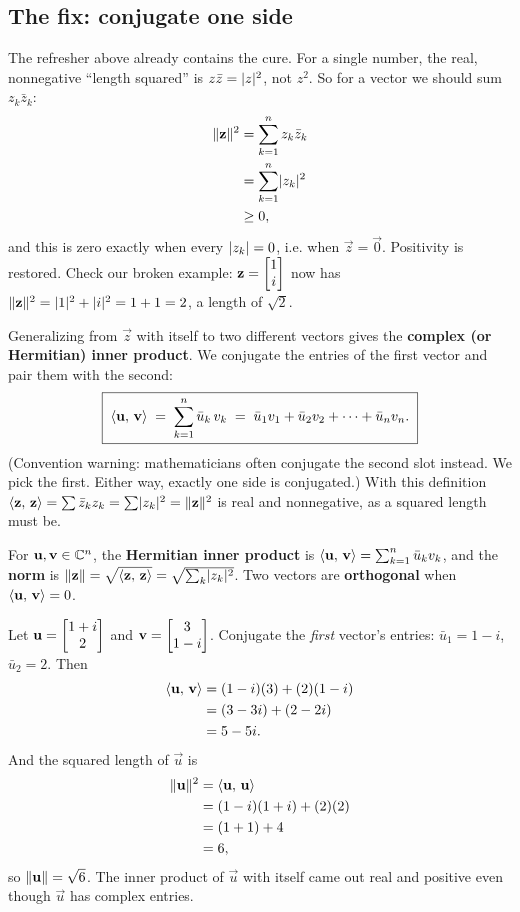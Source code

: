 \subsection{The fix: conjugate one side}

The refresher above already contains the cure. For a single number, the real,
nonnegative ``length squared'' is $z\bar z = \lvert z\rvert^2$, not $z^2$. So for a vector
we should sum $z_k\bar z_k$:
\begin{align*}
  \lVert\mathbf{z}\rVert^2 &= \sum_{k=1}^n z_k\bar z_k \\
  &= \sum_{k=1}^n \lvert z_k\rvert^2 \\
  &\ge 0,
\end{align*}
and this is zero exactly when every $\lvert z_k\rvert=0$, i.e. when $\vec z = \vec 0$.
Positivity is restored. Check our broken example: $\mathbf{z}=\begin{bmatrix}1\\i\end{bmatrix}$ now has
$\lVert\mathbf{z}\rVert^2 = \lvert1\rvert^2 + \lvert i\rvert^2 = 1 + 1 = 2$, a length of
$\sqrt 2$.

Generalizing from $\vec z$ with itself to two different vectors gives the
\textbf{complex (or Hermitian) inner product}. We conjugate the entries of the
first vector and pair them with the second:
\[
  \boxed{\;\langle \mathbf{u},\, \mathbf{v} \rangle \;=\; \sum_{k=1}^n \bar u_k\, v_k
  \;=\; \bar u_1 v_1 + \bar u_2 v_2 + \cdots + \bar u_n v_n. \;}
\]
(Convention warning: mathematicians often conjugate the second slot instead. We pick
the first. Either way, exactly one side is
conjugated.) With this definition $\langle \mathbf{z},\, \mathbf{z} \rangle = \sum\bar z_kz_k =
\sum\lvert z_k\rvert^2 = \lVert\mathbf{z}\rVert^2$ is real and nonnegative, as a squared length
must be.

\begin{definition}\label{ch32:inner}
For $\mathbf{u},\mathbf{v}\in\mathbb{C}^n$, the \textbf{Hermitian inner product} is
$\langle \mathbf{u},\, \mathbf{v} \rangle = \sum_{k=1}^n \bar u_k v_k$, and the \textbf{norm} is
$\lVert\mathbf{z}\rVert = \sqrt{\langle \mathbf{z},\, \mathbf{z} \rangle} = \sqrt{\sum_k\lvert z_k\rvert^2}$.
Two vectors are \textbf{orthogonal} when $\langle \mathbf{u},\, \mathbf{v} \rangle=0$.
\end{definition}

\begin{example}\label{ch32:innerex}
Let $\mathbf{u} = \begin{bmatrix}1+i \\ 2\end{bmatrix}$ and $\mathbf{v} = \begin{bmatrix}3 \\ 1-i\end{bmatrix}$. Conjugate the
\emph{first} vector's entries: $\bar u_1 = 1-i$, $\bar u_2 = 2$. Then
\begin{align*}
  \langle \mathbf{u},\, \mathbf{v} \rangle &= (1-i)(3) + (2)(1-i) \\
  &= (3-3i) + (2-2i) \\
  &= 5 - 5i.
\end{align*}
And the squared length of $\vec u$ is
\begin{align*}
  \lVert\mathbf{u}\rVert^2 &= \langle \mathbf{u},\, \mathbf{u} \rangle \\
  &= (1-i)(1+i) + (2)(2) \\
  &= (1+1) + 4 \\
  &= 6,
\end{align*}
so $\lVert\mathbf{u}\rVert = \sqrt 6$. The inner product of $\vec u$ with itself came out
real and positive even though $\vec u$ has complex entries.
\end{example}

